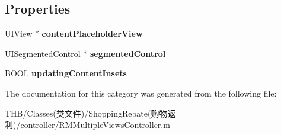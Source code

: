 \subsection*{Properties}
\begin{DoxyCompactItemize}
\item 
\mbox{\label{category_r_m_multiple_views_controller_07_08_a5e955fb4aecd2fdce409eb460bc239f4}} 
U\+I\+View $\ast$ {\bfseries content\+Placeholder\+View}
\item 
\mbox{\label{category_r_m_multiple_views_controller_07_08_a6cc0f098aef5e88f7747d2bd81779e4a}} 
U\+I\+Segmented\+Control $\ast$ {\bfseries segmented\+Control}
\item 
\mbox{\label{category_r_m_multiple_views_controller_07_08_a9c881ebba5900b65ab3320ad2649152b}} 
B\+O\+OL {\bfseries updating\+Content\+Insets}
\end{DoxyCompactItemize}


The documentation for this category was generated from the following file\+:\begin{DoxyCompactItemize}
\item 
T\+H\+B/\+Classes(类文件)/\+Shopping\+Rebate(购物返利)/controller/R\+M\+Multiple\+Views\+Controller.\+m\end{DoxyCompactItemize}
